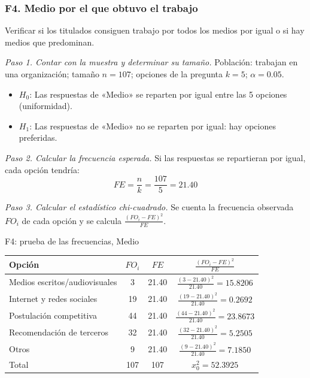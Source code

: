 \subsubsection*{F4. Medio por el que obtuvo el trabajo}

Verificar si los titulados consiguen trabajo por todos los medios por igual o si hay medios que predominan.

\textit{Paso 1. Contar con la muestra y determinar su tamaño.} Población: trabajan en una organización; tamaño $n = 107$; opciones de la pregunta $k = 5$; $\alpha = 0.05$.

\begin{itemize}[nosep]
  \item $H_0$: Las respuestas de «Medio» se reparten por igual entre las 5 opciones (uniformidad).
  \item $H_1$: Las respuestas de «Medio» no se reparten por igual: hay opciones preferidas.
\end{itemize}

\textit{Paso 2. Calcular la frecuencia esperada.} Si las respuestas se repartieran por igual, cada opción tendría:
\[
FE = \frac{n}{k} = \frac{107}{5} = 21.40
\]

\textit{Paso 3. Calcular el estadístico chi-cuadrado.} Se cuenta la frecuencia observada $FO_i$ de cada opción y se calcula $\frac{(FO_i - FE)^2}{FE}$.

\begin{mitabla}{F4: prueba de las frecuencias, Medio}
\begin{tabular}{L{6cm}ccc}
\toprule
Opción & $FO_i$ & $FE$ & $\frac{(FO_i-FE)^2}{FE}$ \\
\midrule
Medios escritos/audiovisuales & 3 & 21.40 & $\frac{(3-21.40)^2}{21.40} = 15.8206$ \\[3pt]
Internet y redes sociales & 19 & 21.40 & $\frac{(19-21.40)^2}{21.40} = 0.2692$ \\[3pt]
Postulación competitiva & 44 & 21.40 & $\frac{(44-21.40)^2}{21.40} = 23.8673$ \\[3pt]
Recomendación de terceros & 32 & 21.40 & $\frac{(32-21.40)^2}{21.40} = 5.2505$ \\[3pt]
Otros & 9 & 21.40 & $\frac{(9-21.40)^2}{21.40} = 7.1850$ \\[3pt]
\midrule
Total & 107 & 107 & $x_0^2 = 52.3925$ \\
\bottomrule
\end{tabular}
\end{mitabla}

